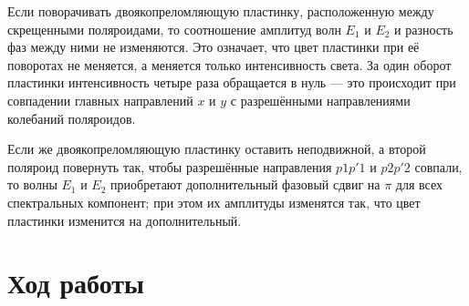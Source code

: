\documentclass[a4paper, 12pt]{article}%
\begin{document}
Если поворачивать двоякопреломляющую пластинку, расположенную между
скрещенными поляроидами, то соотношение амплитуд волн $ E_1 $ и $ E_2 $ и разность фаз между ними не изменяются. Это означает, что цвет пластинки при её поворотах не меняется, а меняется только интенсивность света. За один оборот пластинки интенсивность четыре раза обращается в нуль --- это происходит при совпадении главных направлений
$ x $ и $ y $ с разрешёнными направлениями колебаний поляроидов.

Если же двоякопреломляющую пластинку оставить неподвижной, а
второй поляроид повернуть так, чтобы разрешённые направления $ p1p'1 $
и $ p2p'2 $ совпали, то волны $ E_1 $ и $ E_2 $ приобретают дополнительный фазовый сдвиг на $ \pi $ для всех спектральных компонент; при этом их амплитуды изменятся так, что цвет пластинки изменится на дополнительный. 

\section{Ход работы}
\end{document}
